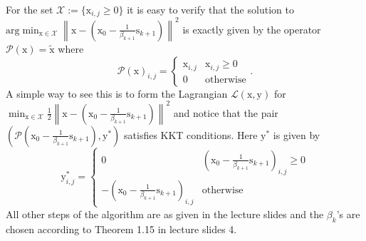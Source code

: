 \documentclass{article}
\newcommand{\0}{\mathrm{0}}
\newcommand{\1}{\mathrm{1}}
\newcommand{\s}{\mathrm{s}}
\newcommand{\x}{\mathrm{x}}
\newcommand{\y}{\mathrm{y}}
\newcommand{\norm}[1]{\left\| #1 \right\|}
\begin{document}
For the set $\mathcal{X} := \{\x_{i,j} \geq 0\}$ it is easy to verify that the solution to $\text{arg}\min_{\x\in\mathcal{X}}\norm{\x - (\x_0 - \frac{1}{\beta_{k+1}}\s_{k+1})}^2$ is exactly given by the operator $\mathcal{P}(\x) = \tilde{\x}$ where
\begin{equation*}
  \mathcal{P}(\x)_{i,j} = \begin{cases}
    \x_{i,j} & \x_{i,j} \geq 0\\
    0 &\text{otherwise}
    \end{cases}.
\end{equation*}
A simple way to see this is to form the Lagrangian $\mathcal{L}(\x,\y)$ for $\min_{\x\in\mathcal{X}}\frac{1}{2}\norm{\x - (\x_0 - \frac{1}{\beta_{k+1}}\s_{k+1})}^2$ and notice that the pair $(\mathcal{P}(\x_0 - \frac{1}{\beta_{k+1}}\s_{k+1}),\y^*)$ satisfies KKT conditions. Here $\y^*$ is given by
\begin{equation*}
  \y^*_{i,j} = \begin{cases}
    0 &  (\x_0 - \frac{1}{\beta_{k+1}}\s_{k+1})_{i,j} \geq 0\\
    -(\x_0 - \frac{1}{\beta_{k+1}}\s_{k+1})_{i,j} &\text{otherwise}
    \end{cases}
\end{equation*}
All other steps of the algorithm are as given in the lecture slides and the $\beta_k$'s are chosen according to Theorem 1.15 in lecture slides 4.
\end{document}
